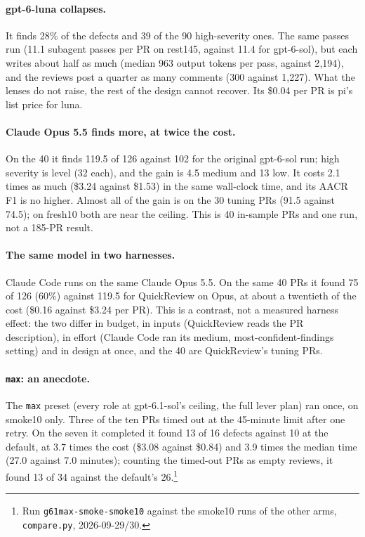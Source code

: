 \documentclass[11pt,a4paper]{article}
\newcommand{\qcr}{QuickReview}
\newcommand{\code}[1]{\texttt{#1}}
\begin{document}
\paragraph{gpt-6-luna collapses.} It finds 28\% of the defects and 39 of the
90 high-severity ones. The same passes run (11.1 subagent passes per PR on
rest145, against 11.4 for gpt-6-sol), but each writes about half as much
(median 963 output tokens per pass, against 2{,}194), and the reviews post a
quarter as many comments (300 against 1{,}227). What the lenses do not
raise, the rest of the design cannot recover. Its \$0.04 per PR is pi's list
price for luna.

\paragraph{Claude Opus 5.5 finds more, at twice the cost.} On the 40 it
finds 119.5 of 126 against 102 for the original gpt-6-sol run; high
severity is level (32 each), and the gain is 4.5 medium and 13 low. It costs
2.1 times as much (\$3.24 against \$1.53) in the same wall-clock time, and
its AACR F1 is no higher. Almost all of the gain is on the 30 tuning PRs
(91.5 against 74.5); on fresh10 both are near the ceiling. This is 40
in-sample PRs and one run, not a 185-PR result.

\paragraph{The same model in two harnesses.} Claude Code runs on the same
Claude Opus 5.5. On the same 40 PRs it found 75 of 126 (60\%) against 119.5
for \qcr{} on Opus, at about a twentieth of the cost (\$0.16 against \$3.24
per PR). This is a contrast, not a measured harness effect: the two differ in
budget, in inputs (\qcr{} reads the PR description), in effort (Claude Code
ran its medium, most-confident-findings setting) and in design at once, and
the 40 are \qcr{}'s tuning PRs.

\paragraph{\code{max}: an anecdote.} The \code{max} preset (every role at
gpt-6.1-sol's ceiling, the full lever plan) ran once, on smoke10 only. Three
of the ten PRs timed out at the 45-minute limit after one retry. On the
seven it completed it found 13 of 16 defects against 10 at the default, at
3.7 times the cost (\$3.08 against \$0.84) and 3.9 times the median time
(27.0 against 7.0 minutes); counting the timed-out PRs as empty reviews, it
found 13 of 34 against the default's 26.\footnote{Run
\code{g61max-smoke-smoke10} against the smoke10 runs of the other arms,
\code{compare.py}, 2026-09-29/30.}
\end{document}
